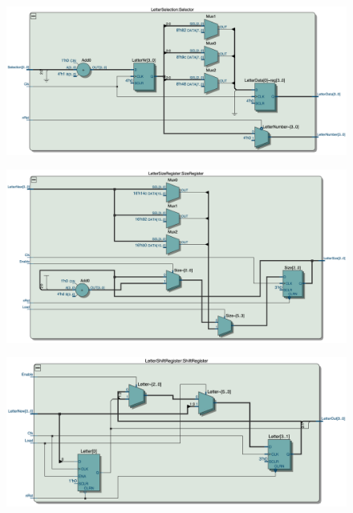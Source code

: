 \documentclass{article}
\begin{document}
\clearpage
\begin{figure}[h]
    \centering
    \includegraphics[width=1\textwidth]{Figures/Part3_RTL_Selector.jpg}
    \label{fig:p3_RTL_Sel}
\end{figure}

\hfill

\begin{figure}[h]
    \centering
    \includegraphics[width=1\textwidth]{Figures/Part3_RTL_Size.jpg}
    \label{fig:p3_RTL_Size}
\end{figure}

\clearpage
\begin{figure}[h]
    \centering
    \includegraphics[width=1\textwidth]{Figures/Part3_RTL_Shifter.jpg}
    \label{fig:p3_RTL_Shift}
\end{figure}
\end{document}
